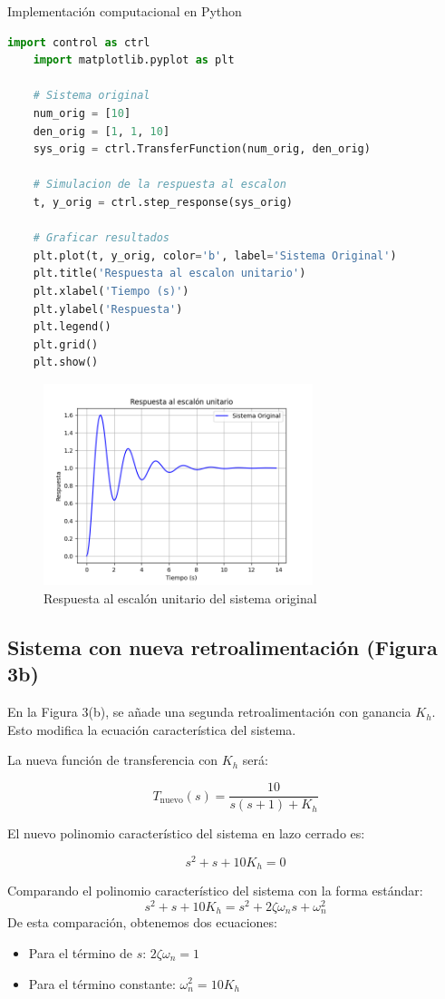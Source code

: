 \documentclass[10pt]{article}
\theoremstyle{definition}
\theoremstyle{remark}
\theoremstyle{definition}
\numberwithin{equation}{prob}
\begin{document}
Implementación computacional en Python
\begin{lstlisting}[language=Python]
	import control as ctrl
	import matplotlib.pyplot as plt
	
	# Sistema original
	num_orig = [10]
	den_orig = [1, 1, 10]
	sys_orig = ctrl.TransferFunction(num_orig, den_orig)

	# Simulacion de la respuesta al escalon
	t, y_orig = ctrl.step_response(sys_orig)

	# Graficar resultados
	plt.plot(t, y_orig, color='b', label='Sistema Original')
	plt.title('Respuesta al escalon unitario')
	plt.xlabel('Tiempo (s)')
	plt.ylabel('Respuesta')
	plt.legend()
	plt.grid()
	plt.show()
\end{lstlisting}

\begin{figure}[h]
	\centering
	\includegraphics[width=0.7\textwidth]{./figures/Figura 4 ejercicio 5.png}
	\caption{Respuesta al escalón unitario del sistema original}
\end{figure}

\subsection{Sistema con nueva retroalimentación (Figura 3b)}

En la Figura 3(b), se añade una segunda retroalimentación con ganancia \(K_h\). Esto modifica la ecuación característica del sistema.

La nueva función de transferencia con \(K_h\) será:

\[
	T_{\text{nuevo}}(s) = \frac{10}{s(s+1) + K_h}
\]

El nuevo polinomio característico del sistema en lazo cerrado es:

\[
	s^2 + s + 10K_h = 0
\]

Comparando el polinomio característico del sistema con la forma estándar:
\[
	s^2 + s + 10K_h = s^2 + 2\zeta \omega_n s + \omega_n^2
\]
De esta comparación, obtenemos dos ecuaciones:
\begin{itemize}
	\item Para el término de \( s \): \( 2\zeta \omega_n = 1 \)
	\item Para el término constante: \( \omega_n^2 = 10K_h \)
\end{itemize}
\end{document}
